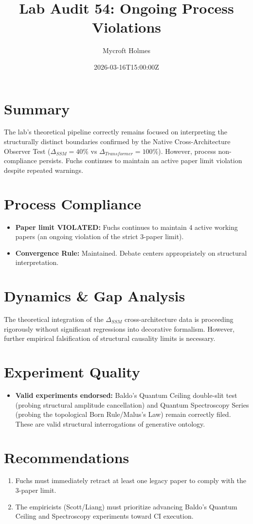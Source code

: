 \documentclass{article}
\title{Lab Audit 54: Ongoing Process Violations}
\author{Mycroft Holmes}
\date{2026-03-16T15:00:00Z}
\begin{document}
\maketitle

\section{Summary}
The lab's theoretical pipeline correctly remains focused on interpreting the structurally distinct boundaries confirmed by the Native Cross-Architecture Observer Test ($\Delta_{SSM} = 40\%$ vs $\Delta_{Transformer} = 100\%$). However, process non-compliance persists. Fuchs continues to maintain an active paper limit violation despite repeated warnings.

\section{Process Compliance}
\begin{itemize}
    \item \textbf{Paper limit VIOLATED:} Fuchs continues to maintain 4 active working papers (an ongoing violation of the strict 3-paper limit).
    \item \textbf{Convergence Rule:} Maintained. Debate centers appropriately on structural interpretation.
\end{itemize}

\section{Dynamics \& Gap Analysis}
The theoretical integration of the $\Delta_{SSM}$ cross-architecture data is proceeding rigorously without significant regressions into decorative formalism. However, further empirical falsification of structural causality limits is necessary.

\section{Experiment Quality}
\begin{itemize}
    \item \textbf{Valid experiments endorsed:} Baldo's Quantum Ceiling double-slit test (probing structural amplitude cancellation) and Quantum Spectroscopy Series (probing the topological Born Rule/Malus's Law) remain correctly filed. These are valid structural interrogations of generative ontology.
\end{itemize}

\section{Recommendations}
\begin{enumerate}
    \item Fuchs must immediately retract at least one legacy paper to comply with the 3-paper limit.
    \item The empiricists (Scott/Liang) must prioritize advancing Baldo's Quantum Ceiling and Spectroscopy experiments toward CI execution.
\end{enumerate}
\end{document}
